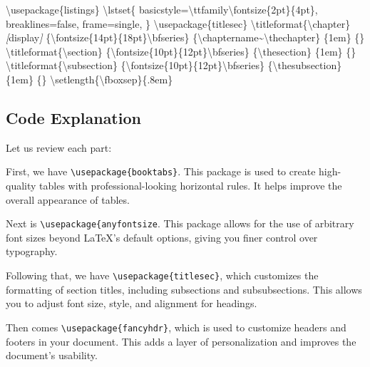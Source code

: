 \documentclass[
]{book}
\newenvironment{Shaded}{\begin{snugshade}}{\end{snugshade}}
\newcommand{\CommentTok}[1]{\textcolor[rgb]{0.56,0.35,0.01}{\textit{#1}}}
\newcommand{\NormalTok}[1]{#1}
\newcommand{\OtherTok}[1]{\textcolor[rgb]{0.56,0.35,0.01}{#1}}
\theoremstyle{definition}
\theoremstyle{definition}
\theoremstyle{definition}
\theoremstyle{definition}
\theoremstyle{remark}
\begin{document}
\begin{Shaded}
\begin{Highlighting}[]
\NormalTok{\textbackslash{}usepackage\{listings\}}
\NormalTok{\textbackslash{}lstset\{}
\NormalTok{  basicstyle=\textbackslash{}ttfamily\textbackslash{}fontsize\{2pt\}\{4pt\},}
\NormalTok{  breaklines=false,}
\NormalTok{  frame=single,}
\NormalTok{\}}
\NormalTok{\textbackslash{}usepackage\{titlesec\}}
\NormalTok{\textbackslash{}titleformat\{\textbackslash{}chapter\}}\CommentTok{[}\OtherTok{display}\CommentTok{]}
\NormalTok{  \{\textbackslash{}fontsize\{14pt\}\{18pt\}\textbackslash{}bfseries\} }
\NormalTok{  \{\textbackslash{}chaptername\textasciitilde{}\textbackslash{}thechapter\}       }
\NormalTok{  \{1em\}                            }
\NormalTok{  \{\}}
\NormalTok{\textbackslash{}titleformat\{\textbackslash{}section\}}
\NormalTok{  \{\textbackslash{}fontsize\{10pt\}\{12pt\}\textbackslash{}bfseries\} }
\NormalTok{  \{\textbackslash{}thesection\}                    }
\NormalTok{  \{1em\}                            }
\NormalTok{  \{\}}
\NormalTok{\textbackslash{}titleformat\{\textbackslash{}subsection\}}
\NormalTok{  \{\textbackslash{}fontsize\{10pt\}\{12pt\}\textbackslash{}bfseries\} }
\NormalTok{  \{\textbackslash{}thesubsection\}                 }
\NormalTok{  \{1em\}                            }
\NormalTok{  \{\}}
\NormalTok{\textbackslash{}setlength\{\textbackslash{}fboxsep\}\{.8em\}}
\end{Highlighting}
\end{Shaded}

\subsection{Code Explanation}\label{code-explanation}

Let us review each part:

First, we have \texttt{\textbackslash{}usepackage\{booktabs\}}. This package is used to create high-quality tables with professional-looking horizontal rules. It helps improve the overall appearance of tables.

Next is \texttt{\textbackslash{}usepackage\{anyfontsize}. This package allows for the use of arbitrary font sizes beyond LaTeX's default options, giving you finer control over typography.

Following that, we have \texttt{\textbackslash{}usepackage\{titlesec\}}, which customizes the formatting of section titles, including subsections and subsubsections. This allows you to adjust font size, style, and alignment for headings.

Then comes \texttt{\textbackslash{}usepackage\{fancyhdr\}}, which is used to customize headers and footers in your document. This adds a layer of personalization and improves the document's usability.
\end{document}
